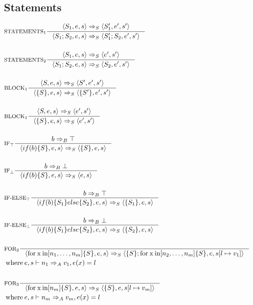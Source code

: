 \subsection{Statements}
\begin{align*}
&\inference[$\text{STATEMENTS}_1$]{\Braket{S_1,e,s} \Rightarrow_S \Braket{S_1',e',s'}}
                         {\Braket{S_1;S_2,e,s} \Rightarrow_S \Braket{S_1';S_2,e',s'}}
\\\\
&\inference[$\text{STATEMENTS}_2$]{\Braket{S_1,e,s} \Rightarrow_S \Braket{e',s'}}
                         {\Braket{S_1;S_2,e,s} \Rightarrow_S \Braket{S_2,e',s'}}
\\\\
&\inference[$\text{BLOCK}_1$]{\Braket{S,e,s} \Rightarrow_S \Braket{S',e',s'}}
                         {\Braket{\{S\},e,s} \Rightarrow_S \Braket{\{S'\},e',s'}}
\\\\
&\inference[$\text{BLOCK}_1$]{\Braket{S,e,s} \Rightarrow_S \Braket{e',s'}}
                         {\Braket{\{S\},e,s} \Rightarrow_S \Braket{e',s'}}
\\\\
&\inference[$\text{IF}_\top$]{b \Rightarrow_B \top}
                      {\Braket{if(b)\{S\},e,s} \Rightarrow_S \Braket{\{S\},e,s}}
\\\\
&\inference[$\text{IF}_\bot$]{b \Rightarrow_B \bot}
                      {\Braket{if(b)\{S\},e,s} \Rightarrow_S \Braket{e,s}}
\\\\
&\inference[$\text{IF-ELSE}_\top$]{b \Rightarrow_B \top}
                      {\Braket{if(b)\{S_1\}else\{S_2\},e,s} \Rightarrow_S \Braket{\{S_1\},e,s}}
\\\\
&\inference[$\text{IF-ELSE}_\bot$]{b \Rightarrow_B \bot}
                      {\Braket{if(b)\{S_1\}else\{S_2\},e,s} \Rightarrow_S \Braket{\{S_2\},e,s}}
\\\\
&\inference[$\text{FOR}_2$]{}
                       {\Braket{\Tfor \mathbin{\text{x}} \mathbin{\text{in}} [n_1,\dots,n_m]\{S\},e,s} \Rightarrow_S \Braket{\{S\}; \Tfor \mathbin{\text{x}} \mathbin{\text{in}} [n_2,\dots,n_m]\{S\},e,s[l\mapsto v_1]}}
\\
&\mathbin{\text{where}} e,s \vdash n_1 \Rightarrow_A v_1,e(x)=l
\\\\
&\inference[$\text{FOR}_3$]{}
                       {\Braket{\Tfor \mathbin{\text{x}} \mathbin{\text{in}} [n_m]\{S\},e,s} \Rightarrow_S \Braket{\{S\},e,s[l\mapsto v_m]}}
\\
&\mathbin{\text{where}} e,s \vdash n_m \Rightarrow_A v_m,e(x)=l
\end{align*}

